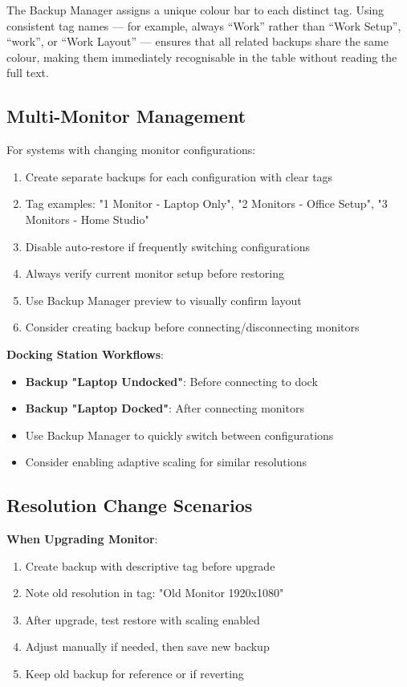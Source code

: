 \documentclass[a4paper,11pt]{article}
\begin{document}
\begin{infobox}
  The Backup Manager assigns a unique colour bar to each distinct tag.
  Using consistent tag names --- for example, always ``Work'' rather than
  ``Work Setup'', ``work'', or ``Work Layout'' --- ensures that all related
  backups share the same colour, making them immediately recognisable in
  the table without reading the full text.
\end{infobox}

\subsection{Multi-Monitor Management}

For systems with changing monitor configurations:

\begin{enumerate}
  \item Create separate backups for each configuration with clear tags
  \item Tag examples: "1 Monitor - Laptop Only", "2 Monitors - Office
    Setup", "3 Monitors - Home Studio"
  \item Disable auto-restore if frequently switching configurations
  \item Always verify current monitor setup before restoring
  \item Use Backup Manager preview to visually confirm layout
  \item Consider creating backup before connecting/disconnecting monitors
\end{enumerate}

\textbf{Docking Station Workflows}:
\begin{itemize}
  \item \textbf{Backup "Laptop Undocked"}: Before connecting to dock
  \item \textbf{Backup "Laptop Docked"}: After connecting monitors
  \item Use Backup Manager to quickly switch between configurations
  \item Consider enabling adaptive scaling for similar resolutions
\end{itemize}

\subsection{Resolution Change Scenarios}

\textbf{When Upgrading Monitor}:
\begin{enumerate}
  \item Create backup with descriptive tag before upgrade
  \item Note old resolution in tag: "Old Monitor 1920x1080"
  \item After upgrade, test restore with scaling enabled
  \item Adjust manually if needed, then save new backup
  \item Keep old backup for reference or if reverting
\end{enumerate}
\end{document}
